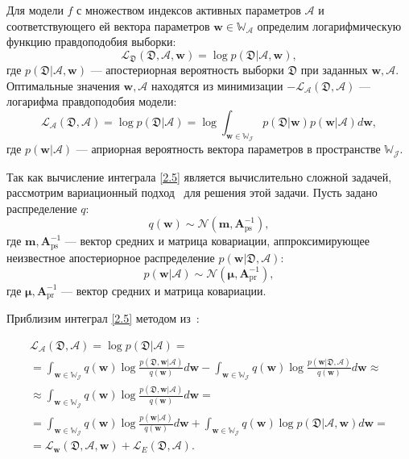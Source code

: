 Для модели $f$ с множеством индексов активных параметров $\mathcal{A}$ и соответствующего ей вектора параметров $\textbf{w} \in \mathbb{W_\mathcal{A}}$  определим логарифмическую функцию правдоподобия выборки:
\[
\label{2.4}
\mathcal{L}_\mathfrak{D}(\mathfrak{D}, \mathcal{A}, \textbf{w}) = \log p(\mathfrak{D}|\mathcal{A}, \textbf{w}),
\]
где $p(\mathfrak{D}|\mathcal{A},\textbf{w})$ --- апостериорная вероятность выборки $\mathfrak{D}$ при заданных $\textbf{w}, \mathcal{A}$.
Оптимальные значения $\textbf{w},\mathcal{A}$ находятся из минимизации $-\mathcal{L}_{\mathcal{A}}(\mathfrak{D},\mathcal{A})$ --- логарифма правдоподобия модели:
\[
\label{2.5}
\mathcal{L}_{\mathcal{A}}(\mathfrak{D},\mathcal{A}) =\log p(\mathfrak{D}|\mathcal{A}) = \log  \int_{{\textbf{w}\in\mathbb{W_\mathcal{J}}}}
p(\mathfrak{D} | \textbf{w}) p(\textbf{w} | \mathcal{A}) d \textbf{w},
\]
где $p(\textbf{w}|\mathcal{A})$ ---  априорная вероятность вектора параметров в пространстве $\mathbb{W_\mathcal{J}}$.

Так как вычисление интеграла \eqref{2.5} является вычислительно сложной задачей, рассмотрим вариационный подход~\cite{bishop2006} для решения этой задачи. Пусть задано распределение $q$:
\[
\label{2.6}
q(\textbf{w})\sim \mathcal{N}(\textbf{m}, \textbf{A}^{-1}_\text{ps}),
\]
где $\textbf{m}, \textbf{A}^{-1}_\text{ps}$ --- вектор средних и матрица ковариации, аппроксимирующее неизвестное апостериорное распределение $p(\textbf{w}|\mathfrak{D},\mathcal{A})$:
\[
\label{2.7}
p(\textbf{w} | \mathcal{A})\sim \mathcal{N}(\boldsymbol{\mu},\textbf{A}^{-1}_{\text{pr}}),
\]
где $\boldsymbol{\mu},\textbf{A}^{-1}_{\text{pr}}$ --- вектор средних и матрица ковариации.

Приблизим интеграл \eqref{2.5} методом из~\cite{bishop2006}:

\[
\label{2.8}
\begin{aligned}
\mathcal{L}_{\mathcal{A}}(\mathfrak{D},\mathcal{A}) = \log p(\mathfrak{D}|\mathcal{A}) = \\
=\int_{\textbf{w}\in\mathbb{W_\mathcal{J}}} q(\textbf{w}) \log \frac{p(\mathfrak{D}, \textbf{w}|\mathcal{A})}{q(\textbf{w})}d \textbf{w} - \int_{\textbf{w}\in\mathbb{W_\mathcal{J}}}  q(\textbf{w}) \log \frac{p(\textbf{w}|\mathfrak{D},\mathcal{A})}{q(\textbf{w})}d \textbf{w} \approx \\
\approx \int_{\textbf{w}\in\mathbb{W_\mathcal{J}}} q(\textbf{w}) \log \frac{p(\mathfrak{D}, \textbf{w}|\mathcal{A})}{q(\textbf{w})}d \textbf{w} = \\
= \int_{\textbf{w}\in\mathbb{W_\mathcal{J}}} q(\textbf{w}) \log \frac{p(\textbf{w}| \mathcal{A})}{q(\textbf{w})}d \textbf{w} + \int_{\textbf{w}\in\mathbb{W_\mathcal{J}}} q(\textbf{w}) \log p(\mathfrak{D}|\mathcal{A}, \textbf{w})d \textbf{w}=\\
=\mathcal{L}_\textbf{w}(\mathfrak{D}, \mathcal{A}, \textbf{w})+\mathcal{L}_{E}(\mathfrak{D},\mathcal{A}).
\end{aligned}
\]

